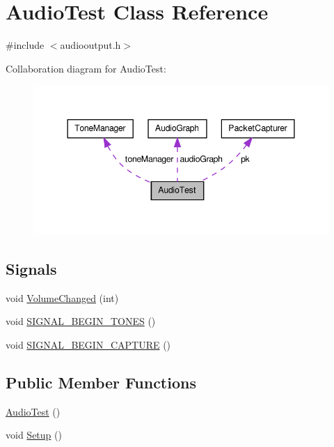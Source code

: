 \hypertarget{class_audio_test}{\section{Audio\-Test Class Reference}
\label{class_audio_test}
}


{\ttfamily \#include $<$audiooutput.\-h$>$}



Collaboration diagram for Audio\-Test\-:
\nopagebreak
\begin{figure}[H]
\begin{center}
\leavevmode
\includegraphics[width=344pt]{class_audio_test__coll__graph}
\end{center}
\end{figure}
\subsection*{Signals}
\begin{DoxyCompactItemize}
\item 
void \hyperlink{class_audio_test_a97c30aeee89c952e4f9e213d26883da6}{Volume\-Changed} (int)
\item 
void \hyperlink{class_audio_test_a44db884ba0eaf1838099d0aeb29a04d6}{S\-I\-G\-N\-A\-L\-\_\-\-B\-E\-G\-I\-N\-\_\-\-T\-O\-N\-E\-S} ()
\item 
void \hyperlink{class_audio_test_a7f324e3db9ffe815a1c1b3af12e520a5}{S\-I\-G\-N\-A\-L\-\_\-\-B\-E\-G\-I\-N\-\_\-\-C\-A\-P\-T\-U\-R\-E} ()
\end{DoxyCompactItemize}
\subsection*{Public Member Functions}
\begin{DoxyCompactItemize}
\item 
\hyperlink{class_audio_test_a086084868d3cadb9b4c8e1a8549425e9}{Audio\-Test} ()
\item 
void \hyperlink{class_audio_test_a717dfe69311252d9890838a250946064}{Setup} ()
\end{DoxyCompactItemize}
